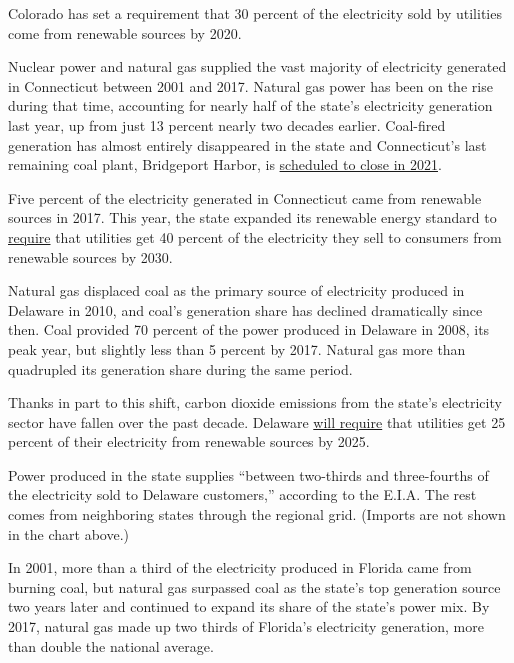 Colorado has set a requirement that 30 percent of the electricity sold
by utilities come from renewable sources by 2020.

Nuclear power and natural gas supplied the vast majority of electricity
generated in Connecticut between 2001 and 2017. Natural gas power has
been on the rise during that time, accounting for nearly half of the
state's electricity generation last year, up from just 13 percent nearly
two decades earlier. Coal-fired generation has almost entirely
disappeared in the state and Connecticut's last remaining coal plant,
Bridgeport Harbor, is
\href{https://www.courant.com/community/bridgeport/hc-last-ct-coal-plant-20160211-story.html}{scheduled
to close in 2021}.

Five percent of the electricity generated in Connecticut came from
renewable sources in 2017. This year, the state expanded its renewable
energy standard to
\href{https://www.utilitydive.com/news/connecticut-lawmakers-pass-sweeping-energy-bill/523264/}{require}
that utilities get 40 percent of the electricity they sell to consumers
from renewable sources by 2030.

Natural gas displaced coal as the primary source of electricity produced
in Delaware in 2010, and coal's generation share has declined
dramatically since then. Coal provided 70 percent of the power produced
in Delaware in 2008, its peak year, but slightly less than 5 percent by
2017. Natural gas more than quadrupled its generation share during the
same period.

Thanks in part to this shift, carbon dioxide emissions from the state's
electricity sector have fallen over the past decade. Delaware
\href{http://www.dnrec.delaware.gov/energy/information/otherinfo/Pages/Renewable.aspx}{will
require} that utilities get 25 percent of their electricity from
renewable sources by 2025.

Power produced in the state supplies ``between two-thirds and
three-fourths of the electricity sold to Delaware customers,'' according
to the E.I.A. The rest comes from neighboring states through the
regional grid. (Imports are not shown in the chart above.)

In 2001, more than a third of the electricity produced in Florida came
from burning coal, but natural gas surpassed coal as the state's top
generation source two years later and continued to expand its share of
the state's power mix. By 2017, natural gas made up two thirds of
Florida's electricity generation, more than double the national average.

